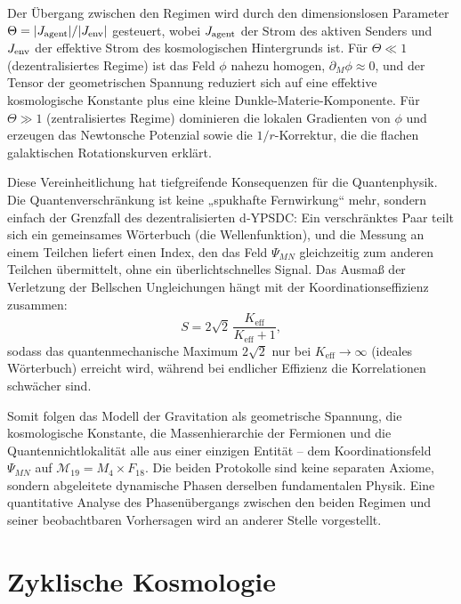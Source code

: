 \documentclass[12pt,a4paper]{article}
\begin{document}
	Der Übergang zwischen den Regimen wird durch den dimensionslosen Parameter \(\Theta = |J_{\rm agent}| / |J_{\rm env}|\) gesteuert, wobei \(J_{\rm agent}\) der Strom des aktiven Senders und \(J_{\rm env}\) der effektive Strom des kosmologischen Hintergrunds ist. Für \(\Theta\ll1\) (dezentralisiertes Regime) ist das Feld \(\phi\) nahezu homogen, \(\partial_M\phi\approx0\), und der Tensor der geometrischen Spannung reduziert sich auf eine effektive kosmologische Konstante plus eine kleine Dunkle-Materie-Komponente. Für \(\Theta\gg1\) (zentralisiertes Regime) dominieren die lokalen Gradienten von \(\phi\) und erzeugen das Newtonsche Potenzial sowie die \(1/r\)-Korrektur, die die flachen galaktischen Rotationskurven erklärt.
	
	Diese Vereinheitlichung hat tiefgreifende Konsequenzen für die Quantenphysik. Die Quantenverschränkung ist keine „spukhafte Fernwirkung“ mehr, sondern einfach der Grenzfall des dezentralisierten d‑YPSDC: Ein verschränktes Paar teilt sich ein gemeinsames Wörterbuch (die Wellenfunktion), und die Messung an einem Teilchen liefert einen Index, den das Feld \(\Psi_{MN}\) gleichzeitig zum anderen Teilchen übermittelt, ohne ein überlichtschnelles Signal. Das Ausmaß der Verletzung der Bellschen Ungleichungen hängt mit der Koordinationseffizienz zusammen:
	\begin{equation}
		S = 2\sqrt{2}\,\frac{K_{\mathrm{eff}}}{K_{\mathrm{eff}}+1},
		\label{eq:bell-eff}
	\end{equation}
	sodass das quantenmechanische Maximum \(2\sqrt{2}\) nur bei \(K_{\mathrm{eff}}\to\infty\) (ideales Wörterbuch) erreicht wird, während bei endlicher Effizienz die Korrelationen schwächer sind.
	
	Somit folgen das Modell der Gravitation als geometrische Spannung, die kosmologische Konstante, die Massenhierarchie der Fermionen und die Quantennichtlokalität alle aus einer einzigen Entität – dem Koordinationsfeld \(\Psi_{MN}\) auf \(\mathcal{M}_{19}=M_4\times F_{18}\). Die beiden Protokolle sind keine separaten Axiome, sondern abgeleitete dynamische Phasen derselben fundamentalen Physik. Eine quantitative Analyse des Phasenübergangs zwischen den beiden Regimen und seiner beobachtbaren Vorhersagen wird an anderer Stelle vorgestellt.
	
	\section{Zyklische Kosmologie}
	
\end{document}
